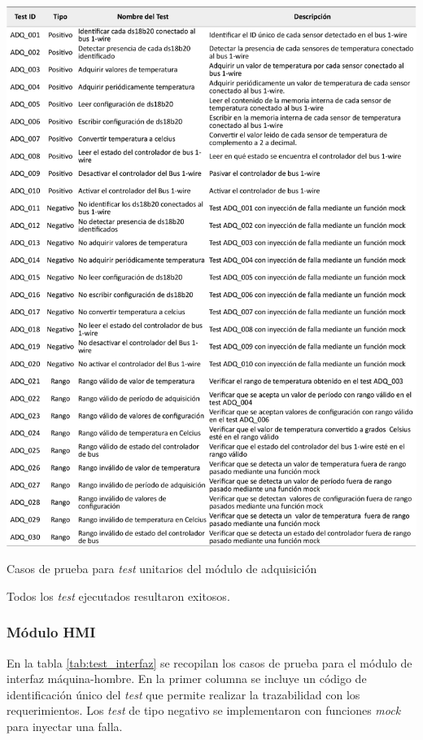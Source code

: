 \begin{table}[!htpb]
	\centering
	\includegraphics[width=\textwidth]{./Figures/TestADQ.pdf}
	\caption{Casos de prueba para \textit{test} unitarios del módulo de adquisición}
	\label{tab:test_adquisición}
\end{table}

Todos los \textit{test} ejecutados resultaron exitosos.

\subsubsection{Módulo HMI}


En la tabla \ref{tab:test_interfaz} se recopilan los casos de prueba para el módulo de interfaz máquina-hombre.  En la primer columna se incluye un código de identificación único del \textit{test} que permite realizar la trazabilidad con los requerimientos. Los \textit{test} de tipo negativo se implementaron con funciones \textit{mock} para inyectar una falla.

